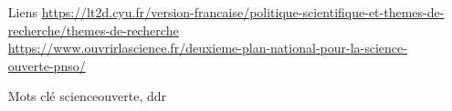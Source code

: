 \documentclass{book}
\begin{document}
\begin{itemize}
    \item [Liens]
        \url{https://lt2d.cyu.fr/version-francaise/politique-scientifique-et-themes-de-recherche/themes-de-recherche}\\
        \url{https://www.ouvrirlascience.fr/deuxieme-plan-national-pour-la-science-ouverte-pnso/}\\
    \item [Mots clé]
        \gls{scienceouverte}, \gls{ddr}
\end{itemize}



\begin{comment}	      
	      Ce guide s'adresse aux chercheurs en SHS et en linguistique (voir le détail des cibles au fur et à mesure) réalisé au laboratoire LT2D dans le cadre de la chaire de Marine Delaborde, enseignante chercheuse à Cergy Paris Université. Celui-ci à pour objectif d'indiquer des recommandations et des bonnes pratiques en matière de constitution et de valorisation de jeux de données à but de recherche scientifique. Le guide vise à renseigner l'utilisateur sur des questions préalables à la constitution d'un jeu de données jusqu'à la mise en valeur de ces jeux de données, donc des travaux du chercheur (c'est l'idée, à reformuler). Il pointe vers différentes ressources utiles à l'utilisateur, sites d'informations, guides, dépots, et organismes spécialisés.

       
	      
	      à intégrer : Le  guide est produit dans le cadre de la chaire de professeure junior
	   
        Financé par l'ANR
        Fait au labo, décrit en fonctions des axes du labo
        Mentionner CERGY, on a accès aux ressources, mentionner la BU. 

        Parler de qui est visé par le guide ? 
	      
	      
	      	      
	      Le LT2D développe des projets de recherche dans le domaine des lexiques, des textes, des discours et des dictionnaires. Conformément à son histoire auparavant écrite au sein de l'UMR LDI, elle-même développée dans la lignée de l'équipe Métadif fondée par le Professeur Jean Pruvost, le LT2D continue de s’inscrire dans le panorama scientifique de CY Cergy Paris Université à travers les domaines de spécialité et d'expertise illustrés par ses thèmes de recherche. 
	      	      
	      Les thèmes de recherche du laboratoire peuvent être regroupés autour de deux thèmes principaux :\\
	      

\end{comment}
\end{document}
